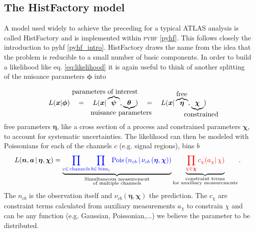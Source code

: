 \subsection{The HistFactory model}

A model used widely to achieve the preceding for a typical ATLAS analysis is called HistFactory \citep{cranmer2012histfactory} and is implemented within \textsc{pyhf} \ref{pyhf}. This follows closely the introduction to pyhf \ref{pyhf_intro}. HistFactory draws the name from the idea that the problem is reducible to a small number of basic components. In order to build a likelihood like eq. \ref{eq:likelihood} it is again useful to think of another splitting of the nuisance parameters $\bm{\phi}$ into

\newcommand{\freeset}{\bm{\eta}}
\newcommand{\constrset}{\bm{\chi}}
\newcommand{\singleconstr}{\chi}
\newcommand{\channelcounts}{\bm{n}}
\newcommand{\auxdata}{\bm{a}}
\newcommand{\poiset}{\bm{\psi}}
\newcommand{\nuisset}{\bm{\theta}}
\newcommand{\fullset}{\bm{\phi}}
\newcommand{\singlefull}{\phi}


\begin{equation}
 L(\bm{x}|\fullset) \quad=\quad
 L(\bm{x}|\overbrace{\poiset}^{\llap{\text{parameters of interest}}},\underbrace{\nuisset}_{\llap{\text{nuisance parameters}}}) \quad=\quad
 L(\bm{x}|\overbrace{\freeset}^{\rlap{\text{free}}},\underbrace{\constrset}_{\rlap{\text{constrained}}}) 
\end{equation}
free parameters $\freeset$, like a cross section of a process and constrained parameters $\constrset$, to account for systematic uncertainties. The likelihood can then be modeled with Poissonians for each of the channels $c$ (e.g. signal regions), bins $b$ 
\begin{equation}
L(\channelcounts, \auxdata \,|\,\freeset,\constrset) = \underbrace{\color{blue}{\prod_{c\in\mathrm{\,channels}} \prod_{b \in \mathrm{\,bins}_c}\textrm{Pois}\left(n_{cb} \,\middle|\, \nu_{cb}\left(\freeset,\constrset\right)\right)}}_{\substack{\text{Simultaneous measurement}\\%
\text{of multiple channels}}} \underbrace{\color{red}{\prod_{\singleconstr \in \constrset} c_{\singleconstr}(a_{\singleconstr} |\, \singleconstr)}}_{\substack{\text{constraint terms}\\%
\text{for }\text{auxiliary measurements}}}.
\end{equation}
The $n_{cb}$ is the observation itself and $\nu_{cb}(\freeset,\constrset)$ the prediction. The $c_{\singleconstr}$ are constraint terms calculated from auxiliary measurements $a_{\singleconstr}$ to constrain $\singleconstr$ and can be any function (e.g. Gaussian, Poissonian,...) we believe the parameter to be distributed. 

